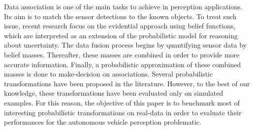 
Data association is one of the main tasks to achieve in perception applications. Its aim is to match the sensor detections to the known objects. To treat such issue, recent research focus on the evidential approach using belief functions, which are interpreted as an extension of the probabilistic model for reasoning about uncertainty. The data fusion process begins by quantifying sensor data by belief masses. Thereafter, these masses are combined in order to provide more accurate information. Finally, a probabilistic approximation of these combined masses is done to make-decision on associations. Several probabilistic transformations have been proposed in the literature. However, to the best of our knowledge, these transformations have been evaluated only on simulated examples. For this reason, the objective of this paper is to benchmark most of interesting probabilistic transformations on real-data in order to evaluate their performances for the autonomous vehicle perception problematic. 

